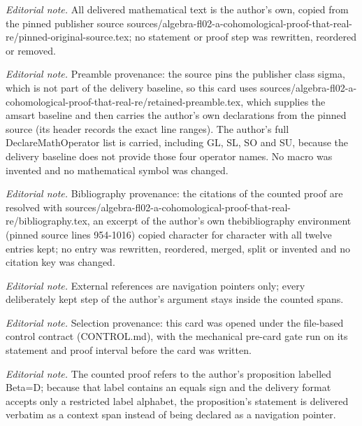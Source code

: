 \maketitle
\noindent\textit{Editorial note.} All delivered mathematical text is the author's own, copied from the pinned publisher source sources/algebra-fl02-a-cohomological-proof-that-real-re/pinned-original-source.tex; no statement or proof step was rewritten, reordered or removed.\par\medskip
\noindent\textit{Editorial note.} Preamble provenance: the source pins the publisher class sigma, which is not part of the delivery baseline, so this card uses sources/algebra-fl02-a-cohomological-proof-that-real-re/retained-preamble.tex, which supplies the amsart baseline and then carries the author's own declarations from the pinned source (its header records the exact line ranges). The author's full DeclareMathOperator list is carried, including GL, SL, SO and SU, because the delivery baseline does not provide those four operator names. No macro was invented and no mathematical symbol was changed.\par\medskip
\noindent\textit{Editorial note.} Bibliography provenance: the citations of the counted proof are resolved with sources/algebra-fl02-a-cohomological-proof-that-real-re/bibliography.tex, an excerpt of the author's own thebibliography environment (pinned source lines 954-1016) copied character for character with all twelve entries kept; no entry was rewritten, reordered, merged, split or invented and no citation key was changed.\par\medskip
\noindent\textit{Editorial note.} External references are navigation pointers only; every deliberately kept step of the author's argument stays inside the counted spans.\par\medskip
\noindent\textit{Editorial note.} Selection provenance: this card was opened under the file-based control contract (CONTROL.md), with the mechanical pre-card gate run on its statement and proof interval before the card was written.\par\medskip
\noindent\textit{Editorial note.} The counted proof refers to the author's proposition labelled Beta=D; because that label contains an equals sign and the delivery format accepts only a restricted label alphabet, the proposition's statement is delivered verbatim as a context span instead of being declared as a navigation pointer.\par\medskip
